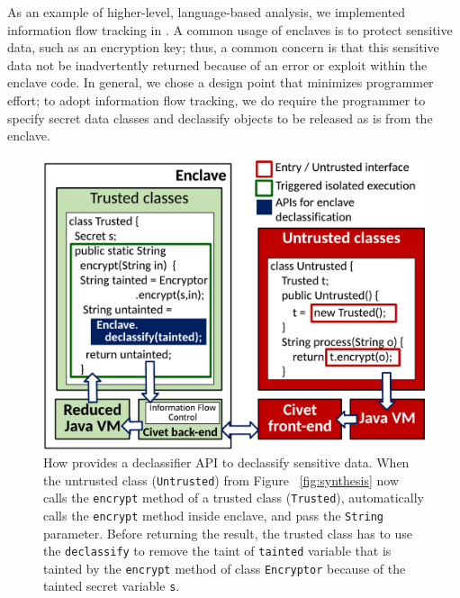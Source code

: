 As an example of higher-level, language-based analysis, we implemented information flow tracking
in \systemname{}.
A common usage of enclaves is to protect sensitive data, such as an encryption key;
thus, a common concern is that this sensitive data not be inadvertently returned because of an error or exploit within the enclave code.
In general, we chose a design point that minimizes programmer effort; to adopt information flow tracking, we
do require the programmer to specify secret data classes and declassify objects to be released as is from the enclave.

\begin{figure}[t!]
	\centering
	\includegraphics[width=0.9\linewidth]{civet/figures/declassify.pdf}
	\footnotesize
	\caption{How \systemname{} provides a declassifier API to declassify sensitive  data.
		When the untrusted class ({\tt Untrusted}) from Figure ~\ref{fig:synthesis} now calls the {\tt encrypt} method of a trusted class ({\tt Trusted}),
		\systemname{} automatically calls the {\tt encrypt} method inside enclave, and pass the {\tt String} parameter.
		Before returning the result, the trusted class has to use the {\tt declassify} to remove the taint of {\tt tainted} variable that is tainted by the {\tt encrypt} method of class {\tt Encryptor} because of the tainted secret variable {\tt s}.
	}
	\label{fig:declassify}
\end{figure}

